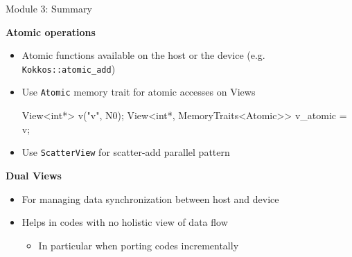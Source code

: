 \begin{frame}[fragile]{Module 3: Summary}

	\textbf{Atomic operations}
        \begin{itemize}
                \item Atomic functions available on the host or the device (e.g. \texttt{Kokkos::atomic\_add})
                \item {Use \texttt{Atomic} memory trait for atomic accesses on Views
\begin{code}[keywords={View,int,MemoryTraits,Atomic}]
View<int*> v("v", N0);
View<int*, MemoryTraits<Atomic>> v_atomic = v;
\end{code}}
                \item Use \texttt{ScatterView} for scatter-add parallel pattern
        \end{itemize}

        \vspace{10pt}
	\textbf{Dual Views}
        \begin{itemize}
                \item For managing data synchronization between host and device
 		\item Helps in codes with no holistic view of data flow
		\begin{itemize}
                   \item In particular when porting codes incrementally
                \end{itemize}
        \end{itemize}

\end{frame}

